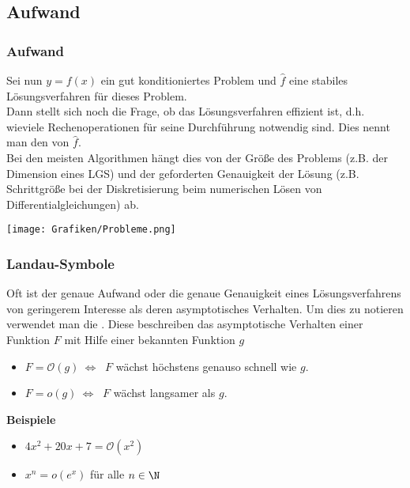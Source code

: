 \subsection{Aufwand}
%
%
\begin{frame}\frametitle{Aufwand}
Sei nun $y=f(x)$ ein gut konditioniertes Problem und $\hat f$ eine stabiles Lösungsverfahren für dieses Problem.\\\vfill
Dann stellt sich noch die Frage, ob das Lösungsverfahren effizient ist, d.h. wieviele Rechenoperationen für seine Durchführung notwendig sind. Dies nennt man den  von $\hat f$.\\\pause \vfill
Bei den meisten Algorithmen hängt dies von der Größe des Problems (z.B. der Dimension eines LGS) und der geforderten Genauigkeit der Lösung (z.B. Schrittgröße bei der Diskretisierung beim numerischen Lösen von Differentialgleichungen) ab.
\end{frame}
%
%
\begin{frame}
\begin{center}
\texttt{[image: Grafiken/Probleme.png]}
\end{center}
\end{frame}
%
%
\begin{frame}\frametitle{Landau-Symbole}
Oft ist der genaue Aufwand oder die genaue Genauigkeit eines Lösungsverfahrens von geringerem Interesse als deren asymptotisches Verhalten. Um dies zu notieren verwendet man die . Diese beschreiben das asymptotische Verhalten einer Funktion $F$ mit Hilfe einer bekannten Funktion $g$
\begin{itemize} 
\item $F=\mathcal O(g) \ \Longleftrightarrow  \ $ $F$ wächst höchstens genauso schnell wie $g$. 
\item $F=o(g)\ \Longleftrightarrow  \ $ $F$ wächst langsamer als $g$.
\end{itemize}
\vfill \pause
\textbf{Beispiele}\\
\begin{itemize}
\item $4x^2+20x+7 = \mathcal O(x^2)$
\item $x^n = o(e^x)$ für alle $n \in \N$
\end{itemize}
\end{frame}
%
%
